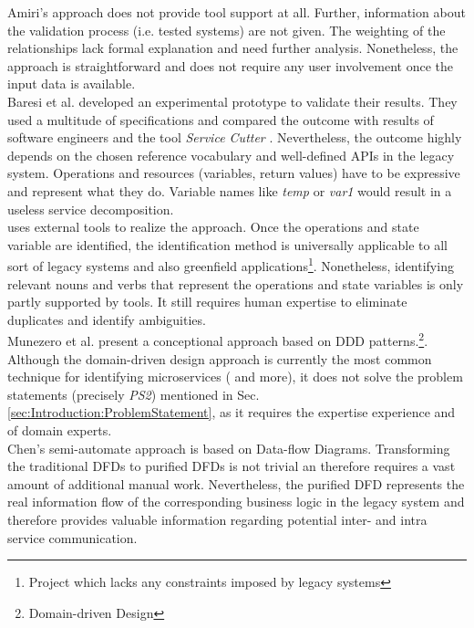 Amiri's approach \cite{ObjectAwareAmiri} does not provide tool support at all. Further, information about the validation process (i.e. tested systems) are not given. The weighting of the relationships lack formal explanation and need further analysis. Nonetheless, the approach is straightforward and does not require any user involvement once the input data is available. \\

Baresi et al. \cite{interfaceAnalysisBaresi} developed an experimental prototype to validate their results. They used a multitude of specifications and compared the outcome  with results of software engineers and the tool \textit{Service Cutter} \cite{ServiceCutter}. Nevertheless, the outcome highly depends on the chosen reference vocabulary and  well-defined APIs in the legacy system. Operations and resources (variables, return values) have to be expressive and represent what they do. Variable names like \textit{temp} or \textit{var1} would result in a useless service decomposition. \\

\cite{FunctionalDecompositionHeinrich} uses external tools to realize the approach. Once the operations and state variable are identified, the identification method is universally applicable to all sort of legacy systems and also greenfield applications\footnote{Project which lacks any constraints imposed by legacy systems}. Nonetheless, identifying relevant nouns and verbs that represent the operations and state variables is only partly supported by tools. It still requires human expertise to eliminate duplicates and identify ambiguities. \\

Munezero et al. present a conceptional approach based on DDD patterns.\footnote{Domain-driven Design}. Although the domain-driven design approach is currently the most common technique for identifying microservices (\cite{FunctionalDecompositionHeinrich}\cite{Fowler}\cite{MigratingTowardsSurvey} and more), it does not solve the problem statements (precisely \textit{PS2}) mentioned in Sec.\ref{sec:Introduction:ProblemStatement}, as it requires the expertise experience and of domain experts.\\

Chen's semi-automate approach \cite{DataflowDrivenChen} is based on Data-flow Diagrams. Transforming the traditional DFDs to purified DFDs is not trivial an therefore requires a vast amount of additional manual work. Nevertheless, the purified DFD represents the real information flow of the corresponding business logic in the legacy system and therefore provides valuable information regarding potential inter- and intra service communication. \\

